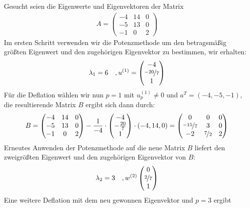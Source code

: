 \begin{colbox}
  Gesucht seien die Eigenwerte und Eigenvektoren der Matrix
  \begin{align*}A = \begin{pmatrix}
    -4 & 14 & 0 \\ -5 & 13 & 0 \\ -1 & 0 & 2
  \end{pmatrix}\end{align*}
  Im ersten Schritt verwenden wir die Potenzmethode um den betragsmäßig größten Eigenwert und den zugehörigen
  Eigenvektor zu bestimmen, wir erhalten:
  \begin{align*}
  \lambda_1=6 \quad, u^{(1)}=\begin{pmatrix}
      -4 \\ \nicefrac{-20}{7} \\ 1
    \end{pmatrix}
  \end{align*}
  Für die Deflation wählen wir nun $p=1$ mit $u_p^{(1)}\neq 0$ und $a^T=(-4, -5, -1)$, die resultierende Matrix $B$
  ergibt sich dann durch:
  \begin{align*}
  B = \begin{pmatrix}
    -4 & 14 & 0 \\ -5 & 13 & 0 \\ -1 & 0 & 2
  \end{pmatrix} - \dfrac{1}{-4}\cdot\begin{pmatrix}
    -4 \\ -\tfrac{20}{7} \\ 1
  \end{pmatrix}\cdot(-4, 14, 0) = \begin{pmatrix}
    0 & 0 & 0 \\ \nicefrac{-15}{7} & 3 & 0 \\ -2 & \nicefrac{7}{2} & 2
  \end{pmatrix}
  \end{align*}
  Erneutes Anwenden der Potenzmethode auf die neue Matrix $B$ liefert den zweigrößten Eigenwert und den
  zugehörigen Eigenvektor von $B$:
  \begin{align*}
    \lambda_2=3 \quad, w^{(2)}\begin{pmatrix}
      0 \\ \nicefrac{2}{7} \\ 1
    \end{pmatrix}
  \end{align*}
  Eine weitere Deflation mit dem neu gewonnen Eigenvektor und $p=3$ ergibt
  \begin{align*}

\end{align*}
\end{colbox}

